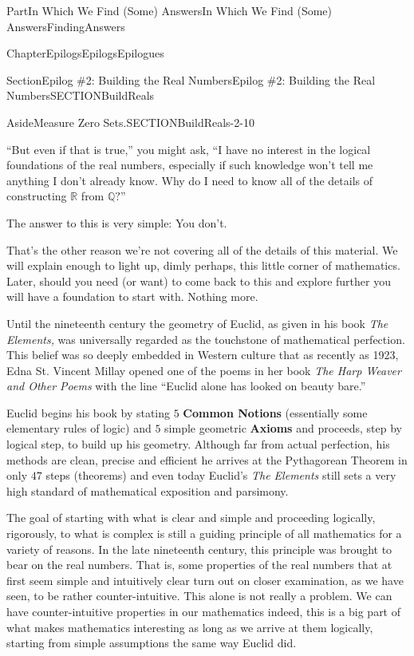 \documentclass[oneside,10pt,]{book}
\newcommand{\terminology}[1]{\textbf{#1}}
\newcommand{\pubtitle}[1]{\textsl{#1}}
\numberwithin{equation}{part}
\newcommand{\RR}{\mathbb {R}}
\newcommand{\QQ}{\mathbb {Q}}
\begin{document}
\begin{partptx}{Part}{In Which We Find (Some) Answers}{}{In Which We Find (Some) Answers}{}{}{FindingAnswers}
\begin{chapterptx}{Chapter}{Epilogs}{}{Epilogs}{}{}{Epilogues}
\begin{sectionptx}{Section}{Epilog \#2: Building the Real Numbers}{}{Epilog \#2: Building the Real Numbers}{}{}{SECTIONBuildReals}
\begin{introduction}{}
\begin{aside}{Aside}{Measure Zero Sets.}{SECTIONBuildReals-2-10}
\end{aside}
``But even if that is true,'' you might ask, ``I have no interest in the logical foundations of the real numbers, especially if such knowledge won't tell me anything I don't already know.  Why do I need to know all of the details of constructing \(\RR\) from \(\QQ?\)''%
\par
The answer to this is very simple: You don't.%
\par
That's the other reason we're not covering all of the details of this material.  We will explain enough to light up, dimly perhaps, this little corner of mathematics. Later, should you need (or want) to come back to this and explore further you will have a foundation to start with. Nothing more.%
\par
Until the nineteenth century the geometry of Euclid, as given in his book \pubtitle{The Elements,} was universally regarded as the touchstone of mathematical perfection.  This belief was so deeply embedded in Western culture that as recently as 1923, Edna St. Vincent Millay opened one of the poems in her book \pubtitle{The Harp Weaver and Other Poems} with the line ``Euclid alone has looked on beauty bare.''%
\par
Euclid begins his book by stating \(5\) \terminology{Common Notions} (essentially some elementary rules of logic) and \(5\) simple geometric \terminology{Axioms} and proceeds, step by logical step, to build up his geometry. Although far from actual perfection, his methods are clean, precise and efficient \textemdash{} he arrives at the Pythagorean Theorem in only \(47\) steps (theorems) \textemdash{} and even today Euclid's \pubtitle{The Elements} still sets a very high standard of mathematical exposition and parsimony.%
\par
The goal of starting with what is clear and simple and proceeding logically, rigorously, to what is complex is still a guiding principle of all mathematics for a variety of reasons.  In the late nineteenth century, this principle was brought to bear on the real numbers.  That is, some properties of the real numbers that at first seem simple and intuitively clear turn out on closer examination, as we have seen, to be rather counter-intuitive.  This alone is not really a problem.  We can have counter-intuitive properties in our mathematics \textemdash{} indeed, this is a big part of what makes mathematics interesting \textemdash{} as long as we arrive at them logically, starting from simple assumptions the same way Euclid did.%
\par

\end{introduction}
\end{sectionptx}
\end{chapterptx}
\end{partptx}
\end{document}
